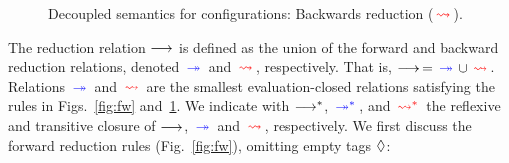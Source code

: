 \documentclass[runningheads]{llncs}
\begin{document}
\begin{figure}[t!]
{\begin{mathpar}
\end{mathpar}
}
\caption{Decoupled semantics for configurations: Backwards reduction ($\bk$).}
\label{fig:bk}
\end{figure}

The reduction relation $\red$ is defined as the union of %
the forward and backward
reduction relations, denoted $\fw$  and $\bk$, respectively. That is, $\red\, = \fw \cup \bk$. Relations $\fw$ and 
$\bk$ are the smallest evaluation-closed relations satisfying the rules in Figs.~\ref{fig:fw} and~\ref{fig:bk}. We indicate with $ \trans{\red} $, $ \fws $, and $ \bks $  the reflexive and transitive closure of $\red$, $\fw$ and $\bk$, respectively.
We first discuss the forward reduction rules (Fig.~\ref{fig:fw}), omitting empty tags $\normark$:
\end{document}
